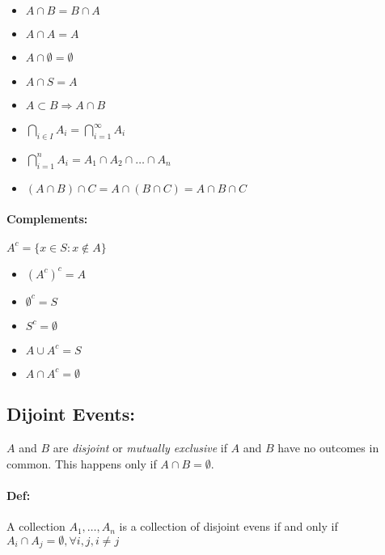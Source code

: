 \documentclass{article}[10pt]
\begin{document}
\begin{multicols}{2}
            \begin{itemize}
                \item[] \(A \cap B = B \cap A \)
                \item[] \(A \cap A = A \)
                \item[] \(A \cap \emptyset = \emptyset \)
                \item[] \(A \cap S = A\)
                \item[] \(A \subset B \Rightarrow A \cap B\)
                \item[] \(\bigcap\limits_{i\in I}A_i = \bigcap\limits_{i=1}^{\infty}A_i\)
                \item[] \(\bigcap\limits_{i=1}^{n}A_i = A_1 \cap A_2 \cap \dots \cap A_n \)
                \item[] \( (A \cap B) \cap C = A \cap (B \cap C) = A \cap B \cap C\)
            \end{itemize}
        
        \paragraph*{Complements: } 
            \(A^c = \{x \in S: x \notin A\}\)
            
            \begin{itemize}
                \item[] \((A^c)^c = A\)
                \item[] \(\emptyset^c = S\)
                \item[] \(S^c = \emptyset\)
                \item[] \(A\cup A^c = S\)
                \item[] \(A \cap A^c = \emptyset\)
            \end{itemize}
    
    \subsection*{Dijoint Events: } 
        $A$ and $B$ are \textit{disjoint} or \textit{mutually exclusive} if $A$ and $B$ have no outcomes in common. This happens only if \(A \cap B = \emptyset \).
        
        \paragraph*{Def:} 
            A collection \(A_1, \dots, A_n\) is a collection of disjoint evens if and only if \(A_i \cap A_j = \emptyset, \forall i, j, i \neq j\)
            

\end{multicols}
\end{document}

